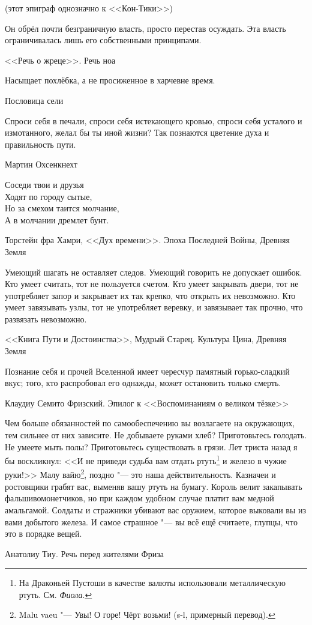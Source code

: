 (этот эпиграф однозначно к <<Кон-Тики>>)

\epigraph
{Он обрёл почти безграничную власть, просто перестав осуждать.
Эта власть ограничивалась лишь его собственными принципами.}
{<<Речь о жреце>>.
Речь ноа}

\epigraph
{Насыщает похлёбка, а не просиженное в харчевне время.}
{Пословица сели}

\epigraph
{Спроси себя в печали, спроси себя истекающего кровью, спроси себя усталого и измотанного, желал бы ты иной жизни?
Так познаются цветение духа и правильность пути.}
{Мартин Охсенкнехт}

\epigraph
{Соседи твои и друзья\\
Ходят по городу сытые,\\
Но за смехом таится молчание,\\
А в молчании дремлет бунт.}
{Торстейн фра Хамри, <<Дух времени>>.
Эпоха Последней Войны, Древняя Земля}

\epigraph
{Умеющий шагать не оставляет следов.
Умеющий говорить не допускает ошибок.
Кто умеет считать, тот не пользуется счетом.
Кто умеет закрывать двери, тот не употребляет запор и закрывает их так крепко, что открыть их невозможно.
Кто умеет завязывать узлы, тот не употребляет веревку, и завязывает так прочно, что развязать невозможно.}
{<<Книга Пути и Достоинства>>, Мудрый Старец.
Культура Цина, Древняя Земля}

\epigraph
{Познание себя и прочей Вселенной имеет чересчур памятный горько-сладкий вкус;
того, кто распробовал его однажды, может остановить только смерть.}
{Клаудиу Семито Фризский.
Эпилог к <<Воспоминаниям о великом тёзке>>}

\epigraph
{Чем больше обязанностей по самообеспечению вы возлагаете на окружающих, тем сильнее от них зависите.
Не добываете руками хлеб?
Приготовьтесь голодать.
Не умеете мыть полы?
Приготовьтесь существовать в грязи.
Лет триста назад я бы воскликнул: <<И не приведи судьба вам отдать ртуть\footnote
{На Драконьей Пустоши в качестве валюты использовали металлическую ртуть. См. \emph{Фиола}. \authornote}
и железо в чужие руки!>>
Малу вайю\footnote
{Malu vaeu "--- Увы! О горе! Чёрт возьми! (s-l, примерный перевод). \authornote},
поздно "--- это наша действительность.
Казначеи и ростовщики грабят вас, выменяв вашу ртуть на бумагу.
Король велит закапывать фальшивомонетчиков, но при каждом удобном случае платит вам медной амальгамой.
Солдаты и стражники убивают вас оружием, которое выковали вы из вами добытого железа.
И самое страшное "--- вы всё ещё считаете, глупцы, что это в порядке вещей.}
{Анатолиу Тиу.
Речь перед жителями Фриза}

